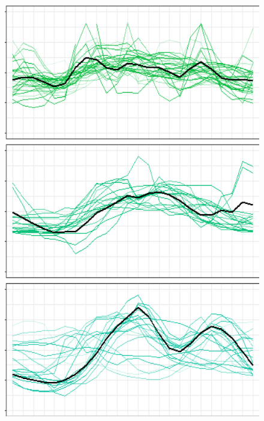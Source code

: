 \documentclass[
	11pt, %
	aspectratio=169, %
]{beamer}
\begin{document}
\begin{frame}
\begin{figure}
\begin{minipage}{0.16\textwidth}
			\includegraphics[width=\linewidth,keepaspectratio]{load_profile_3.png}
		\end{minipage}
		\begin{minipage}{0.16\textwidth}

\end{minipage}
\end{figure}
\end{frame}
\end{document}
